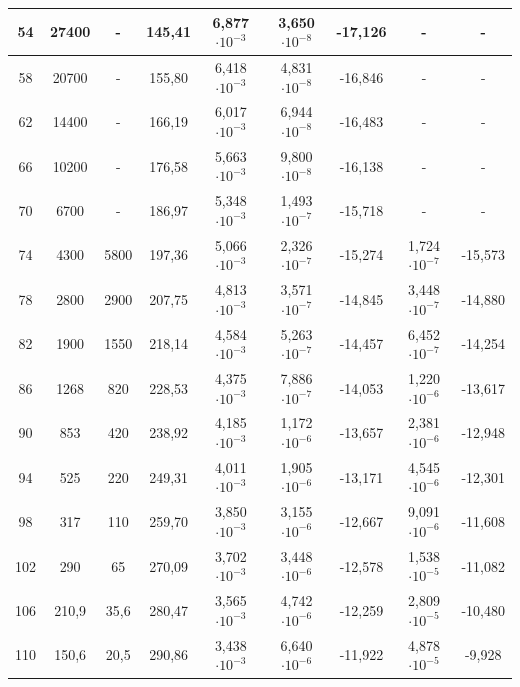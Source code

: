 \documentclass[11pt]{article}
\begin{document}
\begin{table}[h!]
\begin{tabular}{|c|c|c|c|c|c|c|c|c|}
54             & 27400          & -       & 145,41 & 6,877$\cdot10^{-3}$ & 3,650$\cdot10^{-8}$&-17,126 & -           & -     \\ \hline
58             & 20700          & -       & 155,80 & 6,418$\cdot10^{-3}$ & 4,831$\cdot10^{-8}$&-16,846 & -           & -     \\ \hline
62             & 14400          & -       & 166,19 & 6,017$\cdot10^{-3}$ & 6,944$\cdot10^{-8}$&-16,483 & -           & -     \\ \hline
66             & 10200          & -       & 176,58 & 5,663$\cdot10^{-3}$ & 9,800$\cdot10^{-8}$&-16,138 & -           & -     \\ \hline
70             & 6700           & -       & 186,97 & 5,348$\cdot10^{-3}$ & 1,493$\cdot10^{-7}$&-15,718 & -           & -     \\ \hline
74             & 4300           & 5800    & 197,36 & 5,066$\cdot10^{-3}$ & 2,326$\cdot10^{-7}$&-15,274 & 1,724$\cdot10^{-7}$ & -15,573 \\ \hline
78             & 2800           & 2900    & 207,75 & 4,813$\cdot10^{-3}$ & 3,571$\cdot10^{-7}$&-14,845 & 3,448$\cdot10^{-7}$ & -14,880 \\ \hline
82             & 1900           & 1550    & 218,14 & 4,584$\cdot10^{-3}$ & 5,263$\cdot10^{-7}$&-14,457 & 6,452$\cdot10^{-7}$ & -14,254 \\ \hline
86             & 1268           & 820     & 228,53 & 4,375$\cdot10^{-3}$ & 7,886$\cdot10^{-7}$&-14,053 & 1,220$\cdot10^{-6}$ & -13,617 \\ \hline
90             & 853            & 420     & 238,92 & 4,185$\cdot10^{-3}$ & 1,172$\cdot10^{-6}$&-13,657 & 2,381$\cdot10^{-6}$ & -12,948 \\ \hline
94             & 525            & 220     & 249,31 & 4,011$\cdot10^{-3}$ & 1,905$\cdot10^{-6}$&-13,171 & 4,545$\cdot10^{-6}$ & -12,301 \\ \hline
98             & 317            & 110     & 259,70 & 3,850$\cdot10^{-3}$ & 3,155$\cdot10^{-6}$&-12,667 & 9,091$\cdot10^{-6}$ & -11,608 \\ \hline
102            & 290            & 65      & 270,09 & 3,702$\cdot10^{-3}$ & 3,448$\cdot10^{-6}$&-12,578 & 1,538$\cdot10^{-5}$ & -11,082 \\ \hline
106            & 210,9          & 35,6    & 280,47 & 3,565$\cdot10^{-3}$ & 4,742$\cdot10^{-6}$&-12,259 & 2,809$\cdot10^{-5}$ & -10,480 \\ \hline
110            & 150,6          & 20,5    & 290,86 & 3,438$\cdot10^{-3}$ & 6,640$\cdot10^{-6}$&-11,922 & 4,878$\cdot10^{-5}$ & -9,928  \\ \hline

\end{tabular}
\end{table}
\end{document}
